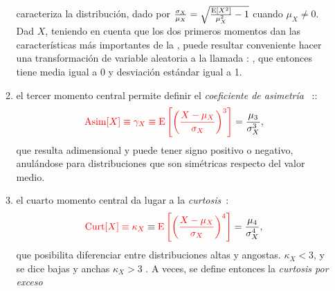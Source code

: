 \begin{itemize}
\begin{enumerate}
  caracteriza   la   distribuci\'on,    dado   por   $\frac{\sigma_X}{\mu_X}   =
  \sqrt{\frac{\operatorname{E}\left[    X^2   \right]}{\mu_X^2}-1}$   cuando    $\mu_X   \ne
  0$. \newline Dad $X$, teniendo en cuenta que los
  dos  primeros  momentos dan  las  caracter\'isticas  m\'as  importantes de  la
  , puede resultar  conveniente hacer una
  transformaci\'on  de  variable  aleatoria  a la  llamada  : ,
    que entonces  tiene media  igual a  0 y    desviaci\'on
  est\'andar igual a 1\modif{)}.
\item {} el tercer momento  central permite definir el
  {\it coeficiente de asimetr\'ia} ~\cite{Pea05}::
  \[
  {\color{red} \operatorname{Asim}[X] \equiv \gamma_X \equiv  \operatorname{E}\left[ \left( \frac{X - \mu_X}{\sigma_X}
      \right)^3 \right]} = \frac{\mu_3}{\sigma_X^3},
  \]
   que resulta adimensional y
  puede tener  signo positivo o  negativo, anul\'andose para  distribuciones que
  son sim\'etricas respecto del valor medio.
\item  {}  el  cuarto momento  central da  lugar a  la
  {\it curtosis}~\cite{Pea05, Wes14}:
  \[
  {\color{red} \operatorname{Curt}[X]  \equiv \kappa_X}  \equiv {\color{red} \operatorname{E}\left[  \left(  \frac{X -
          \mu_X}{\sigma_X} \right)^4 \right]} = \frac{\mu_4}{\sigma_X^4},
  \]
   que posibilita diferenciar
  entre distribuciones  altas y angostas.    $\kappa_X <  3$, y se  dice bajas y  anchas 
  $\kappa_X > 3$ .  A veces, se define entonces la {\it curtosis por exceso} \

\end{enumerate}
\end{itemize}
